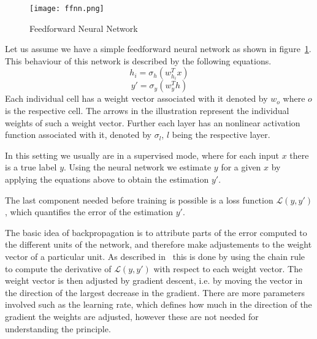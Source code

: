 \begin{figure}[ht]
	\centering
	\captionsetup{width=0.8\textwidth}
    \texttt{[image: ffnn.png]}
    \caption{Feedforward Neural Network}
    \label{fig:ffnn}
\end{figure}

Let us assume we have a simple feedforward neural network as shown in figure~\ref{fig:ffnn}.
This behaviour of this network is described by the following equations.
\begin{equation}\label{eq:ffnn_hidden_layer}
    h_i = \sigma_h(w_{h_i}^Tx)
\end{equation}
\begin{equation}\label{eq:ffnn_output}
    y' = \sigma_y(w_{y}^Th)
\end{equation}
Each individual cell has a weight vector associated with it denoted by $w_o$ where $o$ is the respective cell.
The arrows in the illustration represent the individual weights of such a weight vector.
Further each layer has an nonlinear activation function associated with it, denoted by $\sigma_l$, $l$ being the respective layer.
\par
In this setting we usually are in a supervised mode, where for each input $x$ there is a true label $y$.
Using the neural network we estimate $y$ for a given $x$ by applying the equations above to obtain the estimation $y'$.
\par
The last component needed before training is possible is a loss function $\mathcal{L}(y, y')$, which quantifies the error of the estimation $y'$.
\par
The basic idea of backpropagation is to attribute parts of the error computed to the different units of the network, and therefore make adjustements to the weight vector of a particular unit.
As described in~\cite{rnn_survey} this is done by using the chain rule to compute the derivative of $\mathcal{L}(y, y')$ with respect to each weight vector.
The weight vector is then adjusted by gradient descent, i.e. by moving the vector in the direction of the largest decrease in the gradient.
There are more parameters involved such as the learning rate, which defines how much in the direction of the gradient the weights are adjusted, however these are not needed for understanding the principle.
